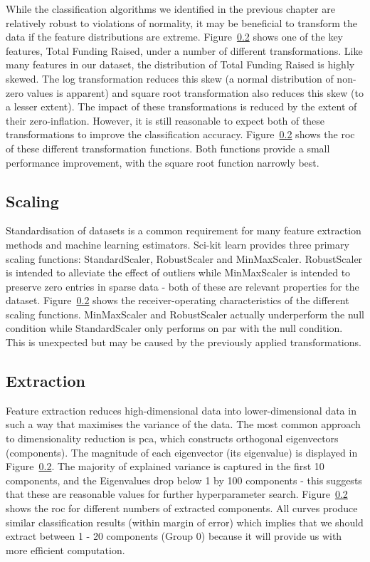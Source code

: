 \documentclass[../thesis/thesis.tex]{subfiles}
\begin{document}
While the classification algorithms we identified in the previous chapter are relatively robust to violations of normality, it may be beneficial to transform the data if the feature distributions are extreme. Figure~\ref{} shows one of the key features, Total Funding Raised, under a number of different transformations. Like many features in our dataset, the distribution of Total Funding Raised is highly skewed. The log transformation reduces this skew (a normal distribution of non-zero values is apparent) and square root transformation also reduces this skew (to a lesser extent). The impact of these transformations is reduced by the extent of their zero-inflation. However, it is still reasonable to expect both of these transformations to improve the classification accuracy. Figure~\ref{} shows the \gls{roc} of these different transformation functions. Both functions provide a small performance improvement, with the square root function narrowly best.



\subsection{Scaling}

Standardisation of datasets is a common requirement for many feature extraction methods and machine learning estimators. Sci-kit learn provides three primary scaling functions: StandardScaler, RobustScaler and MinMaxScaler. RobustScaler is intended to alleviate the effect of outliers while MinMaxScaler is intended to preserve zero entries in sparse data - both of these are relevant properties for the dataset. Figure~\ref{} shows the receiver-operating characteristics of the different scaling functions. MinMaxScaler and RobustScaler actually underperform the null condition while StandardScaler only performs on par with the null condition. This is unexpected but may be caused by the previously applied transformations.


\subsection{Extraction}

Feature extraction reduces high-dimensional data into lower-dimensional data in such a way that maximises the variance of the data. The most common approach to dimensionality reduction is \gls{pca}, which constructs orthogonal eigenvectors (components). The magnitude of each eigenvector (its eigenvalue) is displayed in Figure~\ref{}. The majority of explained variance is captured in the first 10 components, and the Eigenvalues drop below 1 by 100 components - this suggests that these are reasonable values for further hyperparameter search. Figure~\ref{} shows the \gls{roc} for different numbers of extracted components. All curves produce similar classification results (within margin of error) which implies that we should extract between 1 - 20 components (Group 0) because it will provide us with more efficient computation.
\end{document}
